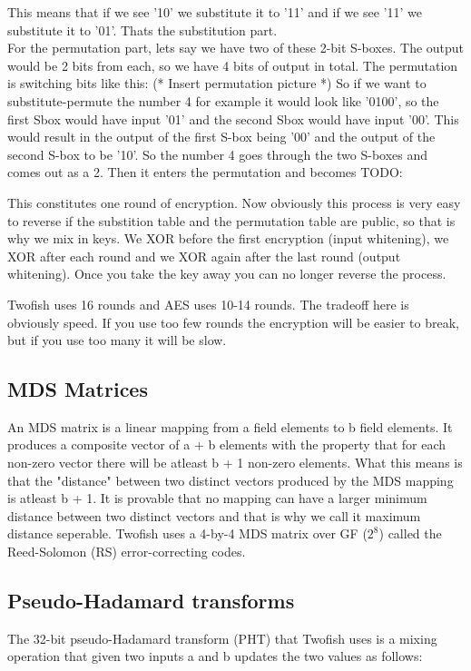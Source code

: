 This means that if we see '10' we substitute it to '11' and if we see '11' we substitute it to '01'. Thats the substitution part. \\
For the permutation part, lets say we have two of these 2-bit S-boxes. The output would be 2 bits from each, so we have 4 bits of output in total. The permutation is switching bits like this:
(* Insert permutation picture *)
So if we want to substitute-permute the number 4 for example it would look like '0100', so the first Sbox would have input '01' and the second Sbox would have input '00'. This would result in the output of the first S-box being '00' and the output of the second S-box to be '10'. So the number 4 goes through the two S-boxes and comes out as a 2. Then it enters the permutation and becomes TODO:

This constitutes one round of encryption. Now obviously this process is very easy to reverse if the substition table and the permutation table are public, so that is why we mix in keys. We XOR before the first encryption (input whitening), we XOR after each round and we XOR again after the last round (output whitening). Once you take the key away you can no longer reverse the process.

Twofish uses 16 rounds and AES uses 10-14 rounds. The tradeoff here is obviously speed. If you use too few rounds the encryption will be easier to break, but if you use too many it will be slow.


\subsection{MDS Matrices}
An MDS matrix is a linear mapping from a field elements to b field elements. It produces a composite vector of a + b elements with the property that for each non-zero vector there will be atleast b + 1 non-zero elements.
What this means is that the "distance" between two distinct vectors produced by the MDS mapping is atleast b + 1.
It is provable that no mapping can have a larger minimum distance between two distinct vectors and that is why we call it maximum distance seperable.
Twofish uses a 4-by-4 MDS matrix over GF ($2^8$) called the Reed-Solomon (RS) error-correcting codes.

\subsection{Pseudo-Hadamard transforms}
The 32-bit pseudo-Hadamard transform (PHT) that Twofish uses is a mixing operation that given two inputs a and b updates the two values as follows:

